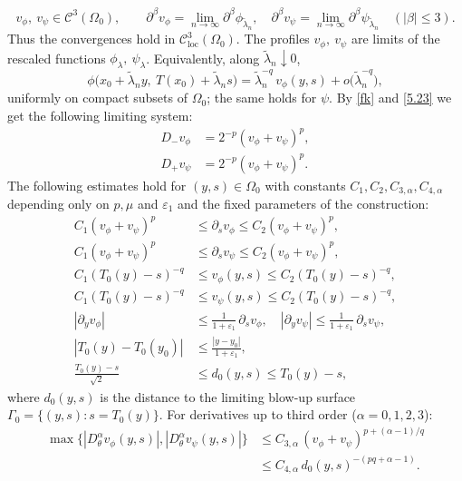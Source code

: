 \documentclass[
  sn-mathphys-num,
  colorlinks,
  linkcolor=darkmagenta,
  citecolor=rufous,
  urlcolor=zaffre,
  hypertexnames=false
]{sn-jnl}
\numberwithin{equation}{section}
\begin{document}
$$
v_\phi,\ v_\psi \in \mathcal{C}^3(\Omega_0),\qquad
\partial^\beta v_\phi=\lim_{n\to\infty}\partial^\beta \phi_{\tilde\lambda_n},\quad
\partial^\beta v_\psi=\lim_{n\to\infty}\partial^\beta \psi_{\tilde\lambda_n}\quad (|\beta|\le 3).
$$
Thus the convergences hold in $\mathcal{C}^3_{\mathrm{loc}}(\Omega_0)$.
The profiles $v_\phi,\ v_\psi$ are limits of the rescaled functions $\phi_\lambda,\ \psi_\lambda$. Equivalently, along $\tilde\lambda_n\downarrow 0$,
\begin{equation}\tag{0.7}
\phi\bigl(x_0+\tilde\lambda_n y,\ T(x_0)+\tilde\lambda_n s\bigr)
=\tilde\lambda_n^{-q}\,v_\phi(y,s)+o\bigl(\tilde\lambda_n^{-q}\bigr),
\end{equation}
uniformly on compact subsets of $\Omega_0$; the same holds for $\psi$.
By  \eqref{fk} and \eqref{5.23} we get the following limiting system:
\begin{equation}\label{eq:4.24}
\begin{aligned}
D_-v_\phi &= 2^{-p}(v_\phi + v_\psi)^p, \\[4pt]
D_+v_\psi &= 2^{-p}(v_\phi + v_\psi)^p.
\end{aligned}
\end{equation}
The following estimates hold for \((y,s) \in \Omega_0\) with constants \(C_1, C_2, C_{3,\alpha}, C_{4,\alpha}\) depending only on \(p,\mu\) and \(\varepsilon_1\) and the fixed parameters of the construction:
\begin{align}
C_1(v_\phi + v_\psi)^p &\leq \partial_s v_\phi \leq C_2(v_\phi + v_\psi)^p, \label{eq:4.25} \\
C_1(v_\phi + v_\psi)^p &\leq \partial_s v_\psi \leq C_2(v_\phi + v_\psi)^p, \label{eq:4.26} \\
C_1(T_0(y) - s)^{-q} &\leq v_\phi(y,s) \leq C_2(T_0(y) - s)^{-q}, \label{eq:4.27} \\
C_1(T_0(y) - s)^{-q} &\leq v_\psi(y,s) \leq C_2(T_0(y) - s)^{-q}, \label{eq:4.28} \\
|\partial_y v_\phi| &\leq \frac{1}{1+\varepsilon_1}\,\partial_s v_\phi, \quad
|\partial_y v_\psi| \leq \frac{1}{1+\varepsilon_1}\,\partial_s v_\psi, \label{eq:4.29} \\
|T_0(y) - T_0(y_0)| &\leq \frac{|y - y_0|}{1 + \varepsilon_1}, \label{eq:4.30} \\
\frac{T_0(y) - s}{\sqrt{2}} &\leq d_0(y,s) \leq T_0(y) - s, \label{eq:4.31}
\end{align}
where \(d_0(y,s)\) is the distance to the limiting blow-up surface \(\Gamma_0 = \{(y,s) : s = T_0(y)\}\).
For derivatives up to third order (\(\alpha = 0,1,2,3\)):
\begin{equation}\label{eq:4.32}
\begin{aligned}
\max\{|D_\theta^\alpha v_\phi(y,s)|, |D_\theta^\alpha v_\psi(y,s)|\} 
&\leq C_{3,\alpha}\,(v_\phi + v_\psi)^{p+(\alpha-1)/q} \\
&\leq C_{4,\alpha}\,d_0(y,s)^{-(pq+\alpha-1)}.
\end{aligned}
\end{equation}
\end{document}
